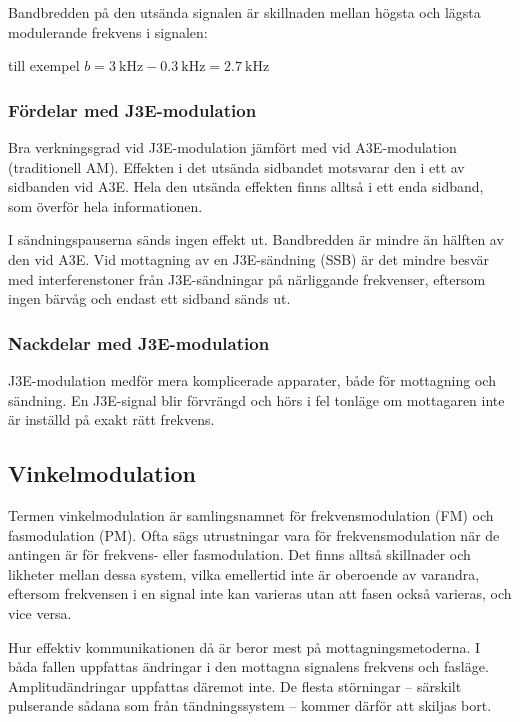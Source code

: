 Bandbredden på den utsända signalen är skillnaden mellan högsta och lägsta
modulerande frekvens i signalen:

till exempel \(b = \SI{3}{\kilo\hertz} - \SI{0,3}{\kilo\hertz} =
\SI{2,7}{\kilo\hertz}\)

\subsubsection{Fördelar med J3E-modulation}
Bra verkningsgrad vid J3E-modulation jämfört med vid A3E-modulation
(traditionell AM).
Effekten i det utsända sidbandet motsvarar den i ett av sidbanden vid A3E.
Hela den utsända effekten finns alltså i ett enda sidband,
som överför hela informationen.

I sändningspauserna sänds ingen effekt ut.
Bandbredden är mindre än hälften av den vid A3E.
Vid mottagning av en J3E-sändning (SSB) är det mindre besvär med
interferenstoner från J3E-sändningar på närliggande frekvenser, eftersom ingen
bärvåg och endast ett sidband sänds ut.

\subsubsection{Nackdelar med J3E-modulation}
J3E-modulation medför mera komplicerade apparater, både för mottagning och
sändning.
En J3E-signal blir förvrängd och hörs i fel tonläge om mottagaren
inte är inställd på exakt rätt frekvens.

\subsection{Vinkelmodulation}
\label{modulation_vinkel}

Termen vinkelmodulation är samlingsnamnet för frekvensmodulation (FM) och
fasmodulation (PM).
Ofta sägs utrustningar vara för frekvensmodulation när de antingen är för
frekvens- eller fasmodulation.
Det finns alltså skillnader och likheter mellan dessa system, vilka emellertid
inte är oberoende av varandra, eftersom frekvensen i en signal inte kan
varieras utan att fasen också varieras, och vice versa.

Hur effektiv kommunikationen då är beror mest på mottagningsmetoderna.
I båda fallen uppfattas ändringar i den mottagna signalens frekvens och fasläge.
Amplitudändringar uppfattas däremot inte.
De flesta störningar -- särskilt pulserande sådana som från tändningssystem --
kommer därför att skiljas bort.

